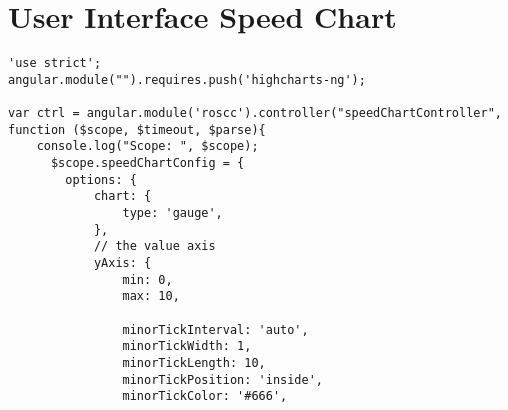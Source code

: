 \section{User Interface Speed Chart}
\begin{verbatim}
'use strict';
angular.module("").requires.push('highcharts-ng');

var ctrl = angular.module('roscc').controller("speedChartController", function ($scope, $timeout, $parse){
    console.log("Scope: ", $scope);
      $scope.speedChartConfig = {
        options: {
            chart: {
                type: 'gauge',
            },
            // the value axis
            yAxis: {
                min: 0,
                max: 10,
                
                minorTickInterval: 'auto',
                minorTickWidth: 1,
                minorTickLength: 10,
                minorTickPosition: 'inside',
                minorTickColor: '#666',
        

\end{verbatim}
